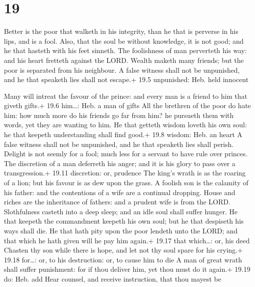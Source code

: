 \hypertarget{section-18}{%
\section{19}\label{section-18}}

 Better is the poor that walketh in his integrity, than he
that is perverse in his lips, and is a fool.  Also, that the
soul be without knowledge, it is not good; and he that hasteth with his
feet sinneth.  The foolishness of man perverteth his way:
and his heart fretteth against the LORD.  Wealth maketh many
friends; but the poor is separated from his neighbour.  A
false witness shall not be unpunished, and he that speaketh lies shall
not escape.+ 19.5 unpunished: Heb. held innocent

 Many will intreat the favour of the prince: and every man
is a friend to him that giveth gifts.+ 19.6 him\ldots: Heb. a man of
gifts  All the brethren of the poor do hate him: how much
more do his friends go far from him? he pursueth them with words, yet
they are wanting to him.  He that getteth wisdom loveth his
own soul: he that keepeth understanding shall find good.+ 19.8 wisdom:
Heb. an heart  A false witness shall not be unpunished, and
he that speaketh lies shall perish.  Delight is not seemly
for a fool; much less for a servant to have rule over princes.
 The discretion of a man deferreth his anger; and it is his
glory to pass over a transgression.+ 19.11 discretion: or, prudence
 The king's wrath is as the roaring of a lion; but his
favour is as dew upon the grass.  A foolish son is the
calamity of his father: and the contentions of a wife are a continual
dropping.  House and riches are the inheritance of fathers:
and a prudent wife is from the LORD.  Slothfulness casteth
into a deep sleep; and an idle soul shall suffer hunger. 
He that keepeth the commandment keepeth his own soul; but he that
despiseth his ways shall die.  He that hath pity upon the
poor lendeth unto the LORD; and that which he hath given will he pay him
again.+ 19.17 that which\ldots: or, his deed  Chasten thy
son while there is hope, and let not thy soul spare for his crying.+
19.18 for\ldots: or, to his destruction: or, to cause him to die
 A man of great wrath shall suffer punishment: for if thou
deliver him, yet thou must do it again.+ 19.19 do: Heb. add
 Hear counsel, and receive instruction, that thou mayest be
